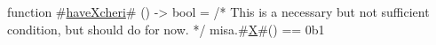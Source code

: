 function #\hyperref[sailRISCVzhaveXcheri]{haveXcheri}# () -> bool =
  /* This is a necessary but not sufficient condition, but should do for now. */
  misa.#\hyperref[sailRISCVzX]{X}#() == 0b1
